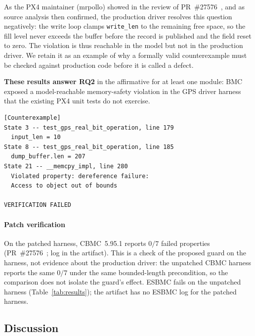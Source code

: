 \documentclass[conference]{IEEEtran}
\newcommand{\entra}[1]{#1}
\newcommand{\corr}[1]{#1}
\begin{document}
\entra{\corr{As the PX4 maintainer (mrpollo) showed in the review of PR~\#27576~\cite{PX4_PR27576}, and as source analysis then confirmed,} the production driver resolves this question
negatively: the write loop clamps \texttt{write\_len} to the remaining
free space, so the fill level never exceeds the buffer before the record
is published and the field reset to zero. The violation is thus
reachable in the model but not in the production driver. We retain it as
an example of why a formally valid counterexample must be checked against production code before it is called a defect.}
\begin{rqbox}
\textbf{These results answer RQ2} in the affirmative for at least one
module: BMC exposed a model-reachable memory-safety violation in the
GPS driver harness that the existing PX4 unit tests do not exercise.
\end{rqbox}

\begin{lstlisting}[float=t,basicstyle=\ttfamily\scriptsize,
numbers=none,language={},captionpos=b,
caption={ESBMC counterexample: unsigned underflow in
\texttt{dumpGpsData()} propagates to out-of-bounds \texttt{memcpy}
(CWE-191 $\rightarrow$ CWE-119). The harness's local
\texttt{dump\_buffer} is the \texttt{dump\_data} buffer passed to
the driver.},label=lst:bug-gps]
[Counterexample]
State 3 -- test_gps_real_bit_operation, line 179
  input_len = 10
State 8 -- test_gps_real_bit_operation, line 185
  dump_buffer.len = 207
State 21 -- __memcpy_impl, line 280
  Violated property: dereference failure:
  Access to object out of bounds

VERIFICATION FAILED
\end{lstlisting}

\paragraph{Patch verification}
On the patched harness, CBMC~5.95.1 reports $0/7$ failed properties (PR~\#27576~\cite{PX4_PR27576}; log in the artifact). This is a check of the proposed guard on the harness, not evidence about the production driver: the unpatched CBMC harness reports the same $0/7$ under the same bounded-length precondition, so the comparison does not isolate the guard's effect. ESBMC fails on the unpatched harness (Table~\ref{tab:results}); the artifact has no ESBMC log for the patched harness.

\subsection{Discussion}
\label{subsec:discussion}
\end{document}
